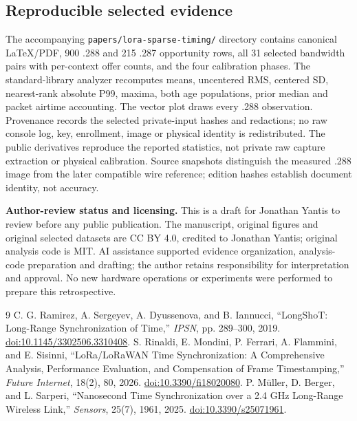 \documentclass[10pt,letterpaper]{article}
\newcommand{\code}[1]{\texttt{\small #1}}
\begin{document}
\subsection{Reproducible selected evidence}
The accompanying \code{papers/lora-sparse-timing/} directory contains canonical
LaTeX/PDF, 900 .288 and 215 .287 opportunity rows, all 31 selected bandwidth
pairs with per-context offer counts, and the four calibration phases.
The standard-library analyzer recomputes means, uncentered RMS, centered SD,
nearest-rank absolute P99, maxima, both age populations, prior median and
packet airtime accounting. The vector plot draws every .288 observation.
Provenance records the selected private-input hashes and redactions; no raw
console log, key, enrollment, image or physical identity is redistributed.
The public derivatives reproduce the reported statistics, not private raw
capture extraction or physical calibration. Source snapshots distinguish the
measured .288 image from the later compatible wire reference; edition hashes
establish document identity, not accuracy.

\textbf{Author-review status and licensing.} This is a draft for Jonathan
Yantis to review before any public publication. The manuscript, original
figures and original selected datasets are CC BY 4.0, credited to Jonathan
Yantis; original analysis code is MIT. AI assistance supported evidence
organization, analysis-code preparation and drafting; the author retains
responsibility for interpretation and approval. No new hardware operations or
experiments were performed to prepare this retrospective.

\begin{thebibliography}{9}\small
{} C. G. Ramirez, A. Sergeyev, A. Dyussenova, and B. Iannucci,
``LongShoT: Long-Range Synchronization of Time,'' \emph{IPSN}, pp. 289--300,
2019. \href{https://doi.org/10.1145/3302506.3310408}{doi:10.1145/3302506.3310408}.
 S. Rinaldi, E. Mondini, P. Ferrari, A. Flammini, and E. Sisinni,
``LoRa/LoRaWAN Time Synchronization: A Comprehensive Analysis, Performance
Evaluation, and Compensation of Frame Timestamping,'' \emph{Future Internet},
18(2), 80, 2026. \href{https://doi.org/10.3390/fi18020080}{doi:10.3390/fi18020080}.
 P. M\"uller, D. Berger, and L. Sarperi, ``Nanosecond Time
Synchronization over a 2.4 GHz Long-Range Wireless Link,'' \emph{Sensors},
25(7), 1961, 2025. \href{https://doi.org/10.3390/s25071961}{doi:10.3390/s25071961}.
\end{thebibliography}
\end{document}
